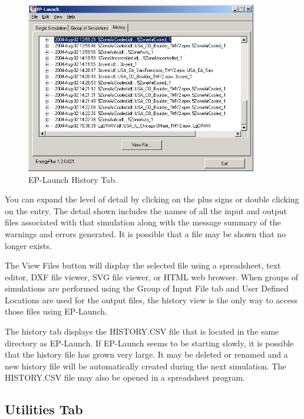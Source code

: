 \begin{figure}[hbtp] %
\centering
\includegraphics[width=0.9\textwidth, height=0.9\textheight, keepaspectratio=true]{media/image112.png}
\caption{EP-Launch History Tab. \protect \label{fig:ep-launch-history-tab.}}
\end{figure}

You can expand the level of detail by clicking on the plus signs or double clicking on the entry. The detail shown includes the names of all the input and output files associated with that simulation along with the message summary of the warnings and errors generated. It is possible that a file may be shown that no longer exists.

The View Files button will display the selected file using a spreadsheet, text editor, DXF file viewer, SVG file viewer, or HTML web browser. When groups of simulations are performed using the Group of Input File tab and User Defined Locations are used for the output files, the history view is the only way to access those files using EP-Launch.

The history tab displays the HISTORY.CSV file that is located in the same directory as EP-Launch. If EP-Launch seems to be starting slowly, it is possible that the history file has grown very large. It may be deleted or renamed and a new history file will be automatically created during the next simulation. The HISTORY.CSV file may also be opened in a spreadsheet program.

\subsection{Utilities Tab}\label{utilities-tab}


